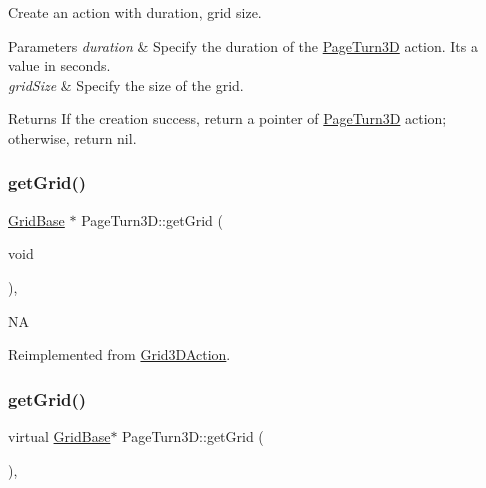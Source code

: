 Create an action with duration, grid size. 


\begin{DoxyParams}{Parameters}
{\em duration} & Specify the duration of the \hyperlink{classPageTurn3D}{Page\+Turn3D} action. It\textquotesingle{}s a value in seconds. \\
\hline
{\em grid\+Size} & Specify the size of the grid. \\
\hline
\end{DoxyParams}
\begin{DoxyReturn}{Returns}
If the creation success, return a pointer of \hyperlink{classPageTurn3D}{Page\+Turn3D} action; otherwise, return nil. 
\end{DoxyReturn}
\mbox{\label{classPageTurn3D_a7b3315a39780438de87cbaa2c9c52c9c}} 
\subsubsection{\texorpdfstring{get\+Grid()}{getGrid()}\hspace{0.1cm}{\footnotesize\ttfamily [1/2]}}
{\footnotesize\ttfamily \hyperlink{classGridBase}{Grid\+Base} $\ast$ Page\+Turn3\+D\+::get\+Grid (\begin{DoxyParamCaption}\item[{void}]{ }\end{DoxyParamCaption})\hspace{0.3cm}{\ttfamily [override]}, {\ttfamily [virtual]}}

NA 

Reimplemented from \hyperlink{classGrid3DAction_ad68b52ba318636b43a4c7aab0a9c2887}{Grid3\+D\+Action}.

\mbox{\label{classPageTurn3D_a69c44c157a7652d2a183dba481bce69a}} 
\subsubsection{\texorpdfstring{get\+Grid()}{getGrid()}\hspace{0.1cm}{\footnotesize\ttfamily [2/2]}}
{\footnotesize\ttfamily virtual \hyperlink{classGridBase}{Grid\+Base}$\ast$ Page\+Turn3\+D\+::get\+Grid (\begin{DoxyParamCaption}{ }\end{DoxyParamCaption})\hspace{0.3cm}{\ttfamily [override]}, {\ttfamily [virtual]}}

